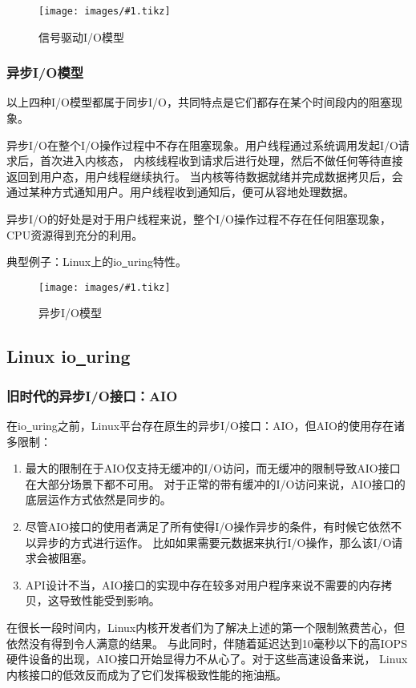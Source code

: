\documentclass[supercite]{HustGraduPaper}
\newcommand{\cfig}[3]{
  \begin{figure}[htb]
    \centering
    \texttt{[image: images/\#1.tikz]}
    \caption{#3}
    \label{fig:#1}
  \end{figure}
}
\theoremstyle{definition}
\begin{document}
\cfig{signal-driven}{0.7}{信号驱动I/O模型}

\subsubsection{异步I/O模型}
以上四种I/O模型都属于同步I/O，共同特点是它们都存在某个时间段内的阻塞现象。\par

异步I/O在整个I/O操作过程中不存在阻塞现象。用户线程通过系统调用发起I/O请求后，首次进入内核态，
内核线程收到请求后进行处理，然后不做任何等待直接返回到用户态，用户线程继续执行。
当内核等待数据就绪并完成数据拷贝后，会通过某种方式通知用户。用户线程收到通知后，便可从容地处理数据。\par

异步I/O的好处是对于用户线程来说，整个I/O操作过程不存在任何阻塞现象，CPU资源得到充分的利用。\par

典型例子：Linux上的io\underline{~}uring特性。\par

\cfig{async-io}{0.7}{异步I/O模型}

\subsection{Linux io\underline{~}uring}

\subsubsection{旧时代的异步I/O接口：AIO}
在io\underline{~}uring之前，Linux平台存在原生的异步I/O接口：AIO，但AIO的使用存在诸多限制：

\begin{enumerate}
  \item 最大的限制在于AIO仅支持无缓冲的I/O访问，而无缓冲的限制导致AIO接口在大部分场景下都不可用。
    对于正常的带有缓冲的I/O访问来说，AIO接口的底层运作方式依然是同步的。
  \item 尽管AIO接口的使用者满足了所有使得I/O操作异步的条件，有时候它依然不以异步的方式进行运作。
    比如如果需要元数据来执行I/O操作，那么该I/O请求会被阻塞。
  \item API设计不当，AIO接口的实现中存在较多对用户程序来说不需要的内存拷贝，这导致性能受到影响。
\end{enumerate}

在很长一段时间内，Linux内核开发者们为了解决上述的第一个限制煞费苦心，但依然没有得到令人满意的结果。
与此同时，伴随着延迟达到10毫秒以下的高IOPS硬件设备的出现，AIO接口开始显得力不从心了。对于这些高速设备来说，
Linux内核接口的低效反而成为了它们发挥极致性能的拖油瓶。\par
\end{document}
